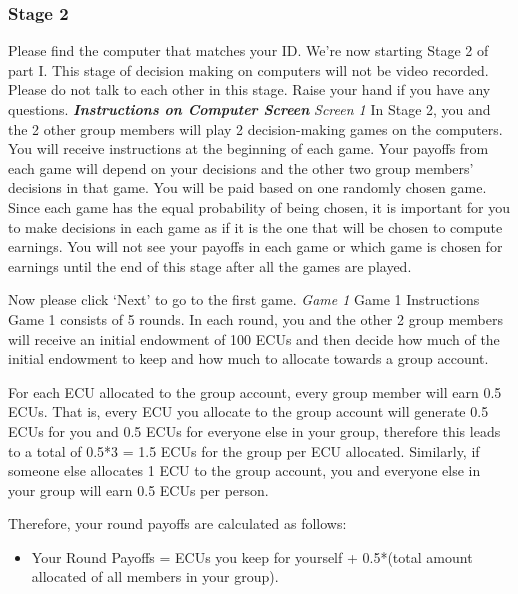 \subsubsection{\textbf{Stage 2}}
Please find the computer that matches your ID. We’re now starting Stage 2 of part I. This stage of decision making on computers will not be video recorded. Please do not talk to each other in this stage. Raise your hand if you have any questions. 
\newline
\textbf{\textit{Instructions on Computer Screen}}
\newline
\textit{Screen 1}
\newline
In Stage 2, you and the 2 other group members will play 2 decision-making games on the computers. You will receive instructions at the beginning of each game. Your payoffs from each game will depend on your decisions and the other two group members’ decisions in that game. You will be paid based on one randomly chosen game. Since each game has the equal probability of being chosen, it is important for you to make decisions in each game as if it is the one that will be chosen to compute earnings. You will not see your payoffs in each game or which game is chosen for earnings until the end of this stage after all the games are played.

Now please click ‘Next’ to go to the first game. 
\newline
\textit{Game 1}
\newline
Game 1 Instructions
\newline
Game 1 consists of 5 rounds. In each round, you and the other 2 group members will receive an initial endowment of 100 ECUs and then decide how much of the initial endowment to keep and how much to allocate towards a group account.

For each ECU allocated to the group account, every group member will earn 0.5 ECUs. That is, every ECU you allocate to the group account will generate 0.5 ECUs for you and 0.5 ECUs for everyone else in your group, therefore this leads to a total of 0.5*3 = 1.5 ECUs for the group per ECU allocated. Similarly, if someone else allocates 1 ECU to the group account, you and everyone else in your group will earn 0.5 ECUs per person.

Therefore, your round payoffs are calculated as follows:
\begin{itemize}
    \item Your Round Payoffs = ECUs you keep for yourself + 0.5*(total amount allocated of all members in your group).
\end{itemize}


